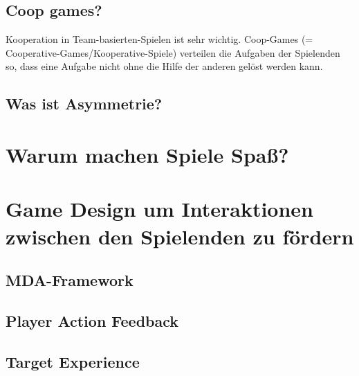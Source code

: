 \subsection{Coop games?}

Kooperation in Team-basierten-Spielen ist sehr wichtig. Coop-Games (= Cooperative-Games/Kooperative-Spiele) verteilen die Aufgaben der Spielenden so, dass eine Aufgabe nicht ohne die Hilfe der anderen gelöst werden kann.

\subsection{Was ist Asymmetrie?}

\section{Warum machen Spiele Spaß?}

\section{Game Design um Interaktionen zwischen den Spielenden zu fördern}

\subsection{MDA-Framework}

\subsection{Player Action Feedback}

\subsection{Target Experience}

